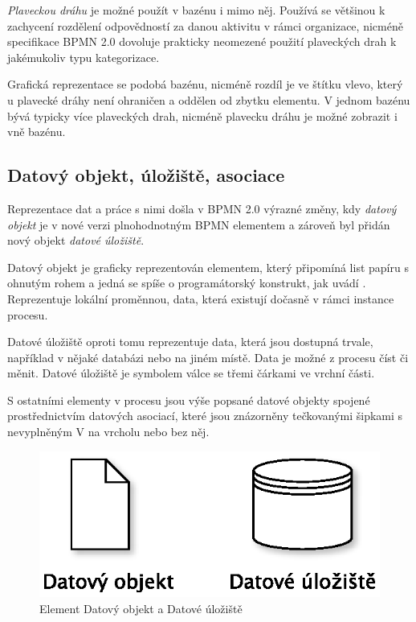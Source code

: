 \documentclass[]{article}
\begin{document}
\textit{Plaveckou dráhu} je možné použít v bazénu i mimo něj. Používá se většinou k zachycení rozdělení odpovědností za danou aktivitu v rámci organizace, nicméně specifikace BPMN 2.0 dovoluje prakticky neomezené použití plaveckých drah k jakémukoliv typu kategorizace. \cite{Silver2011}

Grafická reprezentace se podobá bazénu, nicméně rozdíl je ve štítku vlevo, který u plavecké dráhy není ohraničen a oddělen od zbytku elementu. V jednom bazénu bývá typicky více plaveckých drah, nicméně plavecku dráhu je možné zobrazit i vně bazénu.

\subsection{Datový objekt, úložiště, asociace}
Reprezentace dat a práce s nimi došla v BPMN 2.0 výrazné změny, kdy \textit{datový objekt} je v nové verzi plnohodnotným BPMN elementem a zároveň byl přidán nový objekt \textit{datové úložiště}.

Datový objekt je graficky reprezentován elementem, který připomíná list papíru s ohnutým rohem a jedná se spíše o programátorský konstrukt, jak uvádí \cite{Silver2011}. Reprezentuje lokální proměnnou, data, která existují dočasně v rámci instance procesu.

Datové úložiště oproti tomu reprezentuje data, která jsou dostupná trvale, například v nějaké databázi nebo na jiném místě. Data je možné z procesu číst či měnit. Datové úložiště je symbolem válce se třemi čárkami ve vrchní části.

S ostatními elementy v procesu jsou výše popsané datové objekty spojené prostřednictvím datových asociací, které jsou znázorněny tečkovanými šipkami s nevyplněným V na vrcholu nebo bez něj.

\begin{figure}[H]\centering
\includegraphics[scale=0.7]{obrazky/data-object-store}
\caption{Element Datový objekt a Datové úložiště}
\label{fig:datove_objekty}
\end{figure}
\end{document}
